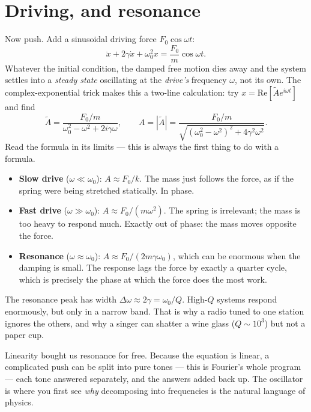 \section{Driving, and resonance}

Now push. Add a sinusoidal driving force $F_0\cos\omega t$:
\[
  \ddot x + 2\gamma \dot x + \omega_0^2 x = \frac{F_0}{m}\cos\omega t .
\]
Whatever the initial condition, the damped free motion dies away and the system settles into a \emph{steady state} oscillating at the \emph{drive's} frequency $\omega$, not its own. The complex-exponential trick makes this a two-line calculation: try $x = \mathrm{Re}[\tilde A e^{i\omega t}]$ and find
\[
  \tilde A = \frac{F_0/m}{\omega_0^2 - \omega^2 + 2i\gamma\omega},
  \qquad
  A = |\tilde A| = \frac{F_0/m}{\sqrt{(\omega_0^2-\omega^2)^2 + 4\gamma^2\omega^2}} .
\]
Read the formula in its limits --- this is always the first thing to do with a formula.
\begin{itemize}[itemsep=3pt]
  \item \textbf{Slow drive} ($\omega \ll \omega_0$): $A \approx F_0/k$. The mass just follows the force, as if the spring were being stretched statically. In phase.
  \item \textbf{Fast drive} ($\omega \gg \omega_0$): $A\approx F_0/(m\omega^2)$. The spring is irrelevant; the mass is too heavy to respond much. Exactly out of phase: the mass moves opposite the force.
  \item \textbf{Resonance} ($\omega \approx \omega_0$): $A\approx F_0/(2m\gamma\omega_0)$, which can be enormous when the damping is small. The response lags the force by exactly a quarter cycle, which is precisely the phase at which the force does the most work.
\end{itemize}
The resonance peak has width $\Delta\omega\approx 2\gamma = \omega_0/Q$. High-$Q$ systems respond enormously, but only in a narrow band. That is why a radio tuned to one station ignores the others, and why a singer can shatter a wine glass ($Q\sim 10^3$) but not a paper cup.

\begin{keyidea}
Linearity bought us resonance for free. Because the equation is linear, a complicated push can be split into pure tones --- this is Fourier's whole program --- each tone answered separately, and the answers added back up. The oscillator is where you first see \emph{why} decomposing into frequencies is the natural language of physics.
\end{keyidea}

